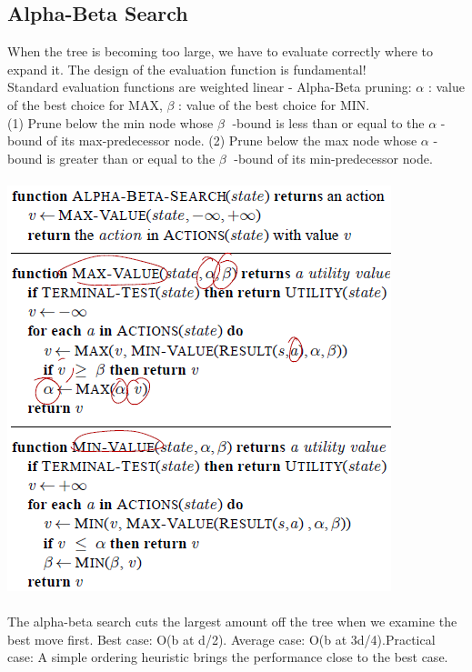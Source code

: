 \documentclass{article}
\begin{document}
\subsection{Alpha-Beta Search}
When the tree is becoming too large, we have to evaluate correctly where to expand it. The design of the evaluation function is fundamental!\\
Standard evaluation functions are weighted linear
- Alpha-Beta pruning: $\alpha$ : value of the best choice for MAX, $\beta$ : value of the best choice for MIN.\\
(1) Prune below the min node whose $\beta$ -bound is less than or equal to the $\alpha$ -bound of its max-predecessor node.
(2) Prune below the max node whose $\alpha$ -bound is greater than or equal to the $\beta$ -bound of its min-predecessor node.\\\\
\includegraphics[scale=0.6]{22.png}\\\\
The alpha-beta search cuts the largest amount off the tree when we examine the best move first. Best case: O(b at d/2). Average case: O(b at 3d/4).Practical case: A simple ordering heuristic brings the performance close to the best case.\\
\end{document}
